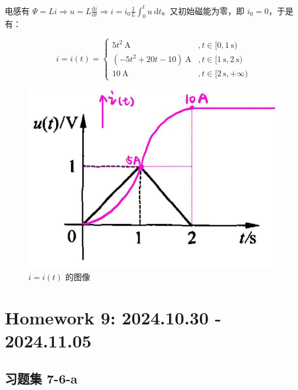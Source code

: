 \documentclass[UTF8]{report}
\theoremstyle{MyLineTheoremStyle} %
\theoremstyle{MyBlockTheoremStyle} %
\theoremstyle{MySubsubsectionStyle} %
\begin{document}
电感有 $\Psi = Li \Longrightarrow u = L \frac{\mathrm{d} i }{\mathrm{d} t } \Longrightarrow i = i_0 \frac{1}{L} \int_{0}^{t} u \ \mathrm{d}t$。又初始磁能为零，即 $i_0 = 0$，于是有：
\begin{center}\noindent\begin{minipage}{0.65\columnwidth}
\begin{equation}
i = i(t) = 
\begin{cases}
    5 t^2 \ \mathrm{A} &, t \in [0, 1 \ \mathrm{s}) \\
    (-5t^2 + 20 t -10) \ \mathrm{A} &, t \in [1 \ \mathrm{s}, 2 \ \mathrm{s}) \\
    10 \ \mathrm{A} &, t \in [2 \ \mathrm{s}, +\infty) 
\end{cases}
\end{equation}
\end{minipage}\hfill\begin{minipage}{0.35\columnwidth}
\begin{figure}[H]\centering
\includegraphics[width=0.8\columnwidth]{assets/8/8a9f16fc9f5993d3dabf5501a18fec1e_720.jpg}
\caption{$i = i(t)$ 的图像}
\end{figure}
\end{minipage}\end{center}


\chapter{Homework 9: 2024.10.30 - 2024.11.05}
\thispagestyle{fancy}

\section{习题集 7-6-a}
\end{document}
